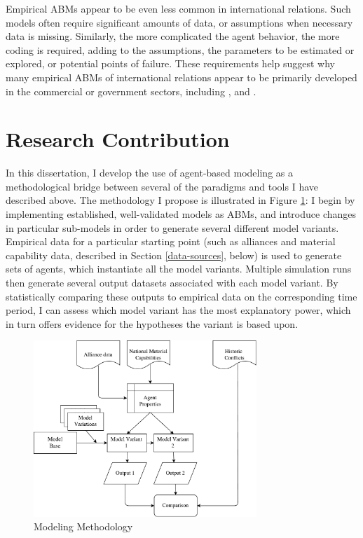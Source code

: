 Empirical ABMs appear to be even less common in international relations. Such models often require significant amounts of data, or assumptions when necessary data is missing. Similarly, the more complicated the agent behavior, the more coding is required, adding to the assumptions, the parameters to be estimated or explored, or potential points of failure. These requirements help suggest why many empirical ABMs of international relations appear to be primarily developed in the commercial or government sectors, including \citet{taylor_2008}, \citet{abdollahian_2006} and \citet{chaturvedi_2000}.

\section{Research Contribution}

In this dissertation, I develop the use of agent-based modeling as a methodological bridge between several of the paradigms and tools I have described above. The methodology I propose is illustrated in Figure \ref{fig:architecture}: I begin by implementing established, well-validated models as ABMs, and introduce changes in particular sub-models in order to generate several different model variants. Empirical data for a particular starting point (such as alliances and material capability data, described in Section \ref{data-sources}, below) is used to generate sets of agents, which instantiate all the model variants. Multiple simulation runs then generate several output datasets associated with each model variant. By statistically comparing these outputs to empirical data on the corresponding time period, I can assess which model variant has the most explanatory power, which in turn offers evidence for the hypotheses the variant is based upon.

\begin{figure}[h!]
	\figSpace
    \centering
	\includegraphics[width=0.75\textwidth]{figures/ModelFlowChart}
    \caption{Modeling Methodology}
    \label{fig:architecture}
    \figSpace
\end{figure}

